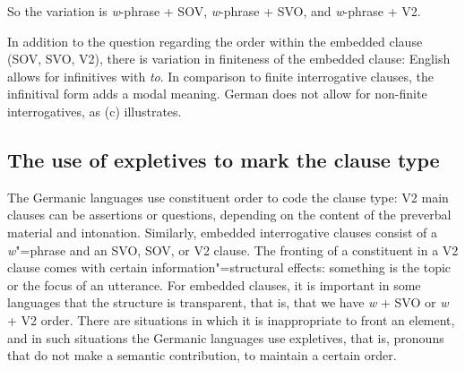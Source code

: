 So the variation is \emph{w}-phrase + SOV, \emph{w}-phrase + SVO, and \emph{w}-phrase + V2.

In addition to the question regarding the order within the embedded clause (SOV, SVO, V2), there is
variation in finiteness of the embedded clause:
\eal
\label{ex-what-to-read}
\zl
English allows for infinitives with \emph{to}. In comparison to finite interrogative clauses, the
infinitival form adds a modal meaning. German does not allow for non-finite interrogatives, as
(c) illustrates.



\subsection{The use of expletives to mark the clause type}
\label{sec-phen-use-of-expletives}

The Germanic languages use constituent order to code the clause type: V2 main clauses can be
assertions or questions, depending on the content of the preverbal material and
intonation. Similarly, embedded interrogative clauses consist of a \emph{w}"=phrase and an SVO, SOV,
or V2 clause. The fronting of a constituent in a V2 clause comes with certain information"=structural
effects: something is the topic or the focus of an utterance. For embedded clauses, it is important
in some languages that the structure is transparent, that is, that we have \emph{w} + SVO or
\emph{w} + V2 order. There are situations in which it is inappropriate to front an element, and in
such situations the Germanic languages use expletives, that is, pronouns that do not make a semantic
contribution, to maintain a certain order.

